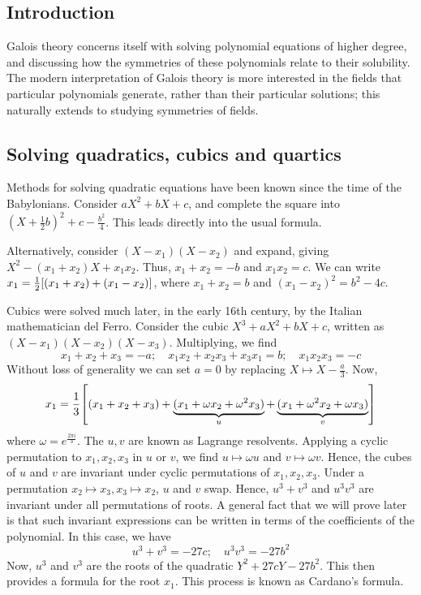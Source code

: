 \subsection{Introduction}
Galois theory concerns itself with solving polynomial equations of higher degree, and discussing how the symmetries of these polynomials relate to their solubility.
The modern interpretation of Galois theory is more interested in the fields that particular polynomials generate, rather than their particular solutions; this naturally extends to studying symmetries of fields.

\subsection{Solving quadratics, cubics and quartics}
Methods for solving quadratic equations have been known since the time of the Babylonians.
Consider \( aX^2 + bX + c \), and complete the square into \( (X + \frac{1}{2} b)^2 + c - \frac{b^2}{4} \).
This leads directly into the usual formula.

Alternatively, consider \( (X-x_1)(X-x_2) \) and expand, giving \( X^2 - (x_1 + x_2) X + x_1 x_2 \).
Thus, \( x_1 + x_2 = -b \) and \( x_1 x_2 = c \).
We can write \( x_1 = \frac{1}{2} \qty[(x_1 + x_2) + (x_1 - x_2)] \), where \( x_1 + x_2 = b \) and \( (x_1 - x_2)^2 = b^2 - 4c \).

Cubics were solved much later, in the early 16th century, by the Italian mathematician del Ferro.
Consider the cubic \( X^3 + aX^2 + bX + c \), written as \( (X-x_1)(X-x_2)(X-x_3) \).
Multiplying, we find
\[ x_1 + x_2 + x_3 = -a;\quad x_1 x_2 + x_2 x_3 + x_3 x_1 = b;\quad x_1 x_2 x_3 = -c \]
Without loss of generality we can set \( a = 0 \) by replacing \( X \mapsto X - \frac{a}{3} \).
Now,
\[ x_1 = \frac{1}{3} \qty[(x_1 + x_2 + x_3) + \underbrace{(x_1 + \omega x_2 + \omega^2 x_3)}_{u} + \underbrace{(x_1 + \omega^2 x_2 + \omega x_3)}_{v}] \]
where \( \omega = e^{\frac{2\pi i}{3}} \).
The \( u, v \) are known as Lagrange resolvents.
Applying a cyclic permutation to \( x_1, x_2, x_3 \) in \( u \) or \( v \), we find \( u \mapsto \omega u \) and \( v \mapsto \omega v \).
Hence, the cubes of \( u \) and \( v \) are invariant under cyclic permutations of \( x_1, x_2, x_3 \).
Under a permutation \( x_2 \mapsto x_3, x_3 \mapsto x_2 \), \( u \) and \( v \) swap.
Hence, \( u^3 + v^3 \) and \( u^3 v^3 \) are invariant under all permutations of roots.
A general fact that we will prove later is that such invariant expressions can be written in terms of the coefficients of the polynomial.
In this case, we have
\[ u^3 + v^3 = -27c;\quad u^3 v^3 = -27 b^2 \]
Now, \( u^3 \) and \( v^3 \) are the roots of the quadratic \( Y^2 + 27cY - 27b^2 \).
This then provides a formula for the root \( x_1 \).
This process is known as Cardano's formula.


